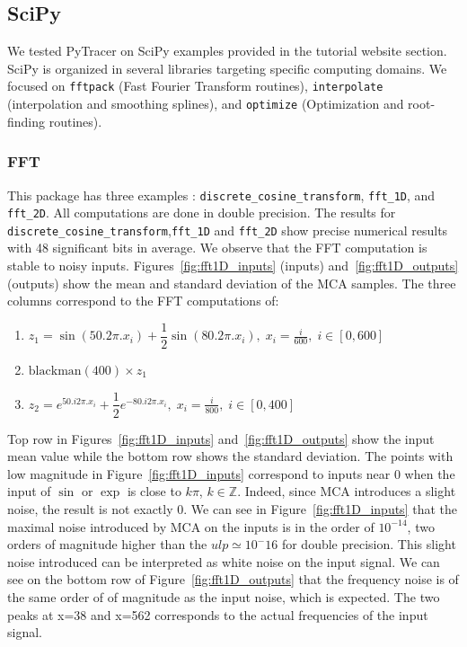 \documentclass[11pt]{article}
\newcommand{\tristan}[1]{\color{orange}\textbf{From Tristan:} #1\color{black}\xspace}
\newcommand{\Yohan}[1]{\color{green!75!black}\textbf{Yohan:} #1\color{black}\xspace}
\newcommand{\pytracer}[0]{PyTracer\xspace}
\begin{document}
\subsection{SciPy}
\label{sec:scipy_tests}

We tested \pytracer on SciPy examples provided in the tutorial website section. 
SciPy is organized in several libraries targeting specific computing domains. We focused on \texttt{fftpack} (Fast Fourier Transform routines), \texttt{interpolate} (interpolation and smoothing splines), and \texttt{optimize} (Optimization and root-finding routines).

\subsubsection{FFT}

This package has three examples : \texttt{discrete\_cosine\_transform}, \texttt{fft\_1D}, and \texttt{fft\_2D}. All computations are done in double precision.
The results for \texttt{discrete\_cosine\_transform},\texttt{fft\_1D} and  \texttt{fft\_2D} show
precise numerical results with 48 significant bits in average. 
We observe that the FFT computation is stable to noisy inputs. Figures~\ref{fig:fft1D_inputs} (inputs) and~\ref{fig:fft1D_outputs} (outputs)
show the mean and standard deviation of the MCA samples. 
The three columns correspond to the FFT computations of: 
\begin{enumerate}
\item $z_1 = \sin(50 . 2\pi . x_i) + \dfrac{1}{2} \sin(80 . 2\pi . x_i),\; x_i = \frac{i}{600},\; i \in [0,600]$
\item $\mathrm{blackman}(400) \times z_1$
\item $ z_2= e^{50 . i 2\pi . x_i} + \dfrac{1}{2} e^{-80 . i2\pi .x_i },\; x_i = \frac{i}{800},\; i \in [0,400] $
\end{enumerate}

Top row in Figures~\ref{fig:fft1D_inputs} and~\ref{fig:fft1D_outputs} 
show the input mean value while the bottom row shows the standard deviation.
The points with low magnitude in Figure~\ref{fig:fft1D_inputs} correspond 
to inputs near 0 when the input of $\sin$ or 
$\exp$ is close to $k\pi$, $k \in \mathbb{Z}$.
Indeed, since MCA introduces a slight noise, the result is not exactly 0.
We can see in Figure~\ref{fig:fft1D_inputs} 
that the maximal noise introduced by MCA on the
inputs is in the order of $10^{-14}$, two orders of magnitude higher than the 
$ulp \simeq 10^-16$ for double precision. 
This slight noise introduced can be interpreted as white noise on the input signal. 
We can see on the bottom row of Figure~\ref{fig:fft1D_outputs} that the frequency noise is of 
the same order of of magnitude as the input noise, which is expected. 
The two peaks at x=38 and x=562 corresponds to the actual frequencies of the input signal.
\end{document}
